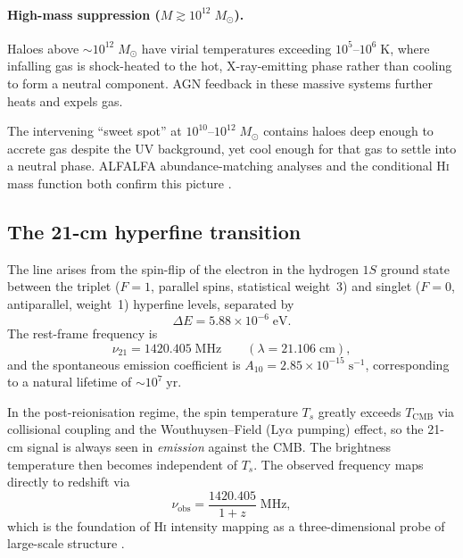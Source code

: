 \documentclass[10pt,a4paper]{article}
\newcommand{\Msun}{M_{\odot}}
\begin{document}
\paragraph{High-mass suppression ($M \gtrsim 10^{12}\;\Msun$).}
Haloes above $\sim\!10^{12}\;\Msun$ have virial temperatures exceeding
$10^{5}$--$10^{6}\;\mathrm{K}$, where infalling gas is shock-heated to the
hot, X-ray-emitting phase rather than cooling to form a neutral component.
AGN feedback in these massive systems further heats and expels gas.

The intervening ``sweet spot'' at $10^{10}$--$10^{12}\;\Msun$ contains haloes
deep enough to accrete gas despite the UV background, yet cool enough for that
gas to settle into a neutral phase.  ALFALFA abundance-matching analyses and
the conditional H\textsc{i} mass function both confirm this picture
\citep{Papastergis2013,Padmanabhan2017}.


\subsection{The 21-cm hyperfine transition}

The line arises from the spin-flip of the electron in the hydrogen $1S$
ground state between the triplet ($F=1$, parallel spins, statistical weight~3)
and singlet ($F=0$, antiparallel, weight~1) hyperfine levels, separated by
\begin{equation}
  \Delta E = 5.88 \times 10^{-6}\;\mathrm{eV}.
\end{equation}
The rest-frame frequency is
\begin{equation}
  \nu_{21} = 1420.405\;\mathrm{MHz}
  \qquad (\lambda = 21.106\;\mathrm{cm}),
\end{equation}
and the spontaneous emission coefficient is
$A_{10} = 2.85 \times 10^{-15}\;\mathrm{s}^{-1}$, corresponding to a natural
lifetime of $\sim\!10^{7}\;\mathrm{yr}$.

In the post-reionisation regime, the spin temperature $T_s$ greatly exceeds
$T_{\mathrm{CMB}}$ via collisional coupling and the Wouthuysen--Field
(Ly$\alpha$ pumping) effect, so the 21-cm signal is always seen in
\emph{emission} against the CMB.  The brightness temperature then becomes
independent of $T_s$.  The observed frequency maps directly to redshift via
\begin{equation}
  \label{eq:nu-z}
  \nu_{\mathrm{obs}} = \frac{1420.405}{1+z}\;\mathrm{MHz},
\end{equation}
which is the foundation of H\textsc{i} intensity mapping as a
three-dimensional probe of large-scale structure
\citep[Pinetti et al.\ Eq.~3.1]{Bharadwaj2004}.
\end{document}
